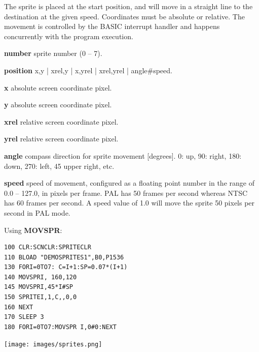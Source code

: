 \begin{description}[leftmargin=2cm,style=nextline]
                The sprite is placed at the start position, and will move
                in a straight line to the destination at the given speed.
                Coordinates must be absolute or relative.
                The movement is controlled by the BASIC interrupt handler and
                happens concurrently with the program execution.

                {\bf number} sprite number (0 -- 7).

                {\bf position} x,y | xrel,y | x,yrel | xrel,yrel | angle\#speed.

                {\bf x} absolute screen coordinate pixel.

                {\bf y} absolute screen coordinate pixel.

                {\bf xrel} relative screen coordinate pixel.

                {\bf yrel} relative screen coordinate pixel.

                {\bf angle} compass direction for sprite movement [degrees].
                0: up, 90: right, 180: down, 270: left, 45 upper right, etc.

                {\bf speed} speed of movement, configured as a floating point number in the
                range of 0.0 -- 127.0, in pixels per frame.
                PAL has 50 frames per second whereas NTSC has 60 frames per second.
                A speed value of 1.0 will move the sprite 50 pixels per second
                in PAL mode.

\item [Example:] Using {\bf MOVSPR}:
\begin{tcolorbox}[colback=black,coltext=white]
\verbatimfont{\codefont}
\begin{verbatim}
100 CLR:SCNCLR:SPRITECLR
110 BLOAD "DEMOSPRITES1",B0,P1536
130 FORI=0TO7: C=I+1:SP=0.07*(I+1)
140 MOVSPRI, 160,120
145 MOVSPRI,45*I#SP
150 SPRITEI,1,C,,0,0
160 NEXT
170 SLEEP 3
180 FORI=0TO7:MOVSPR I,0#0:NEXT
\end{verbatim}
\end{tcolorbox}
\item \begin{center}\texttt{[image: images/sprites.png]}\end{center}
\end{description}


\newpage
